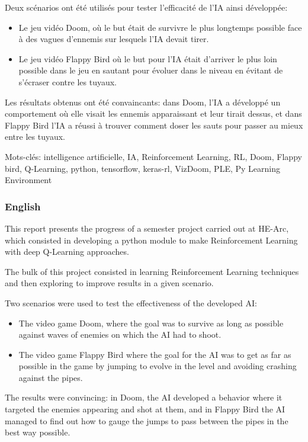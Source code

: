 \documentclass[a4paper,10pt,openany,oneside]{report}
\begin{document}
Deux scénarios ont été utilisés pour tester l'efficacité de l'IA ainsi développée:
\begin{itemize}
\item Le jeu vidéo Doom, où le but était de survivre le plus longtemps possible face à des vagues d'ennemis sur lesquels l'IA devait tirer.
\item Le jeu vidéo Flappy Bird où le but pour l'IA était d'arriver le plus loin possible dans le jeu en sautant pour évoluer dans le niveau en évitant de s'écraser contre les tuyaux.
\end{itemize}


Les résultats obtenus ont été convaincants: dans Doom, l'IA a développé un comportement où elle visait les ennemis apparaissant et leur tirait dessus, et dans Flappy Bird l'IA a réussi à trouver comment doser les sauts pour passer au mieux entre les tuyaux.


Mots-clés: intelligence artificielle, IA, Reinforcement Learning, RL, Doom, Flappy bird, Q-Learning, python, tensorflow, keras-rl, VizDoom, PLE, Py Learning Environment
\subsubsection*{English}
This report presents the progress of a semester project carried out at HE-Arc, which consisted in developing a python module to make Reinforcement Learning with deep Q-Learning approaches.

The bulk of this project consisted in learning Reinforcement Learning techniques and then exploring to improve results in a given scenario.

Two scenarios were used to test the effectiveness of the developed AI:
\begin{itemize}
	\item The video game Doom, where the goal was to survive as long as possible against waves of enemies on which the AI had to shoot.
	\item The video game Flappy Bird where the goal for the AI was to get as far as possible in the game by jumping to evolve in the level and avoiding crashing against the pipes.
\end{itemize}

The results were convincing: in Doom, the AI developed a behavior where it targeted the enemies appearing and shot at them, and in Flappy Bird the AI managed to find out how to gauge the jumps to pass between the pipes in the best way possible.
\end{document}
